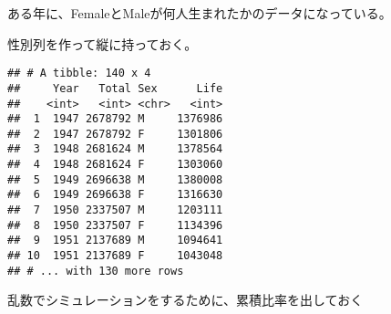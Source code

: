 \documentclass[
]{book}
\newenvironment{Shaded}{\begin{snugshade}}{\end{snugshade}}
\newcommand{\DataTypeTok}[1]{\textcolor[rgb]{0.13,0.29,0.53}{#1}}
\newcommand{\KeywordTok}[1]{\textcolor[rgb]{0.13,0.29,0.53}{\textbf{#1}}}
\newcommand{\NormalTok}[1]{#1}
\newcommand{\OperatorTok}[1]{\textcolor[rgb]{0.81,0.36,0.00}{\textbf{#1}}}
\newcommand{\StringTok}[1]{\textcolor[rgb]{0.31,0.60,0.02}{#1}}
\begin{document}
ある年に、FemaleとMaleが何人生まれたかのデータになっている。

性別列を作って縦に持っておく。

\begin{Shaded}
\end{Shaded}

\begin{verbatim}
## # A tibble: 140 x 4
##     Year   Total Sex      Life
##    <int>   <int> <chr>   <int>
##  1  1947 2678792 M     1376986
##  2  1947 2678792 F     1301806
##  3  1948 2681624 M     1378564
##  4  1948 2681624 F     1303060
##  5  1949 2696638 M     1380008
##  6  1949 2696638 F     1316630
##  7  1950 2337507 M     1203111
##  8  1950 2337507 F     1134396
##  9  1951 2137689 M     1094641
## 10  1951 2137689 F     1043048
## # ... with 130 more rows
\end{verbatim}

乱数でシミュレーションをするために、累積比率を出しておく

\begin{Shaded}
\end{Shaded}
\end{document}
